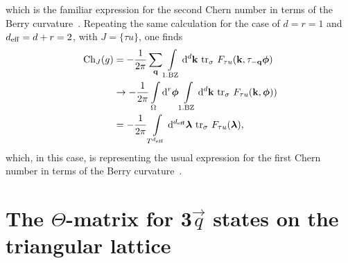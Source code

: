 \documentclass[
    10pt,
    aps,
    prb,
	longbibliography,
    twocolumn,
    floatfix,
    superscriptaddress,
]{revtex4-2}
\begin{document}
which is the familiar expression for the second Chern number in terms of the Berry curvature~\cite{Qi2008}.
Repeating the same calculation for the case of $d=r=1$ and ${d_\mathrm{eff}} =d+r=2$, with $J=\lbrace \tau u \rbrace $, one finds
\begin{align}
	{\rm Ch}_{J}(g)
 & =- \frac{1}{2 \pi}\sum_{\mathbf{q}}
 \int\limits_{\mathrm{1.BZ}}\mathrm{d}^d \mathbf{k} ~
 \mathrm{tr}_\sigma ~F_{\tau u}(\mathbf{k}, \tau_{-\mathbf{q}}\boldsymbol{\phi}) 
 \notag \\
 & \to -\frac{1}{2 \pi} \int\limits_{\Omega} \mathrm{d}^r\boldsymbol{\phi}
 \int\limits_{\mathrm{1.BZ}} \mathrm{d}^d \mathbf{k} ~
 \mathrm{tr}_\sigma ~F_{\tau u}(\mathbf{k},\boldsymbol{\phi}) ) 
 \notag \\
 & = -\frac{1}{2 \pi} \int\limits_{T^{{d_\mathrm{eff}}}}  \mathrm{d}^{d_\mathrm{eff}} \boldsymbol{\lambda}
  ~
 \mathrm{tr}_\sigma ~F_{\tau u}(\boldsymbol{\lambda})  ,
\end{align}
which, in this case, is representing the usual expression for the first Chern number in terms of the Berry curvature~\cite{Qi2008}. 


\section{The \texorpdfstring{$\Theta$-matrix}{Theta-matrix} for \texorpdfstring{3$\vec{q}$}{3q} states on the triangular lattice}
\label{app:theta_matrix_triangular_lattice}
\end{document}
